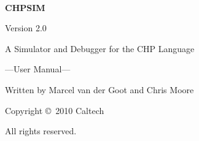 
\begin{center}


\ 

\vskip3cm

\textsf{\fontsize{70}{100}\selectfont\bf CHPSIM}

\bigskip
{\Huge Version 2.0}


\vfil

\Large\bf

A Simulator and Debugger for the CHP Language

\bigskip
\bigskip

{\huge ---User Manual---}

\vfil

Written by Marcel van der Goot and Chris Moore

\vfil


Copyright \copyright \ 2010 Caltech

All rights reserved.

\end{center}


